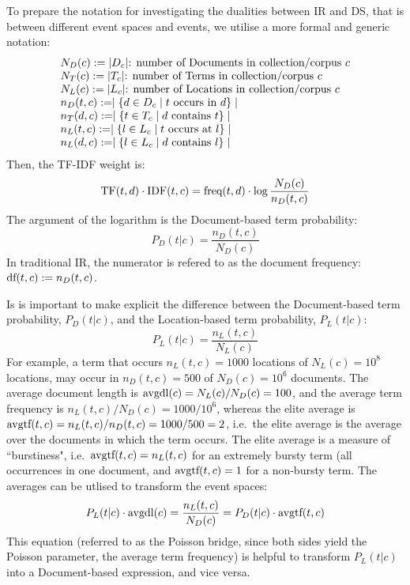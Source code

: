 To prepare the notation for investigating the dualities between IR and DS,
that is between different event spaces and events,
we utilise a more formal and generic notation:
\[
\begin{array}{ll}
N_D(c) := |D_c| \textmd{: number of Documents in collection/corpus $c$}\\
N_T(c) := |T_c| \textmd{: number of Terms in collection/corpus $c$}\\
N_L(c) := |L_c| \textmd{: number of Locations in collection/corpus $c$}\\
n_D(t,c) := \mid \{d \in D_c \mid t \ \textmd{occurs in} \ d\}\mid\\
n_T(d,c) := \mid \{t \in T_c \mid d \ \textmd{contains} \ t\} \mid\\
n_L(t,c) := \mid \{l \in L_c \mid t \ \textmd{occurs at} \ l\} \mid\\
n_L(d,c) := \mid \{l \in L_c \mid d \ \textmd{contains} \ l\} \mid\\
\end{array}
\]
Then, the TF-IDF weight is:
\begin{equation}
\label{tf-idf}
\textmd{TF}(t,d) \cdot \textmd{IDF}(t,c) =
	\textmd{freq}(t, d) \cdot
	\log{{N_D(c)} \over n_D(t,c)}
\end{equation}
The argument of the logarithm is the Document-based term probability:
\[
P_{D}(t|c) =\frac{n_D(t,c)}{N_D(c)}
\]
In traditional IR, the numerator is refered to as the document frequency:
$\textmd{df}(t,c):=n_D(t,c)$.

Is is important to make explicit the difference between the Document-based
term probability, $P_D(t|c)$, and the Location-based term probability, $P_L(t|c)$:
\[
P_{L}(t|c) =\frac{n_L(t,c)}{N_L(c)}
\]
For example, a term that occurs $n_L(t,c)=1000$ locations of $N_L(c)=10^8$ locations,
may occur in $n_D(t,c)=500$ of $N_D(c)=10^6$ documents.
%
The average document length is $\textmd{avgdl}(c)=N_L(c)/N_D(c)=100$, and the
average term frequency is $n_L(t,c)/N_D(c)=1000/10^6$, whereas the
elite average is $\textmd{avgtf}(t,c)=n_L(t,c)/n_D(t,c)=1000/500=2$,
i.e.~the elite average is the average
over the documents in which the term occurs.
%
The elite average is a measure of ``burstiness", i.e.~$\textmd{avgtf}(t,c)=n_L(t,c)$ for
an extremely bursty term (all occurrences in one document, and $\textmd{avgtf}(t,c)=1$
for a non-bursty term.
%
The averages can be utlised to transform the event spaces:
\[
P_L(t|c) \cdot \textmd{avgdl}(c) = \frac{n_L(t,c)}{N_D(c)} = P_D(t|c) \cdot \textmd{avgtf}(t,c)
\]
This equation (referred to as the Poisson bridge, since both sides yield
the Poisson parameter, the average term frequency) is helpful to transform
$P_L(t|c)$ into a Document-based expression, and vice versa.

